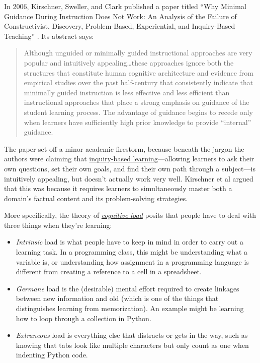 
In 2006, Kirschner, Sweller, and Clark published a paper titled ``Why
Minimal Guidance During Instruction Does Not Work: An Analysis of the
Failure of Constructivist, Discovery, Problem-Based, Experiential, and
Inquiry-Based Teaching'' \cite{fixme}. Its abstract says:

\begin{quote}

  Although unguided or minimally guided instructional approaches are
  very popular and intuitively appealing\ldots{}these approaches
  ignore both the structures that constitute human cognitive
  architecture and evidence from empirical studies over the past
  half-century that consistently indicate that minimally guided
  instruction is less effective and less efficient than instructional
  approaches that place a strong emphasis on guidance of the student
  learning process. The advantage of guidance begins to recede only
  when learners have sufficiently high prior knowledge to provide
  ``internal'' guidance.

\end{quote}

The paper set off a minor academic firestorm, because beneath the jargon
the authors were claiming that
\href{https://en.wikipedia.org/wiki/Inquiry-based\_learning}{inquiry-based
learning}---allowing learners to ask their own questions, set their
own goals, and find their own path through a subject---is intuitively
appealing, but doesn't actually work very well. Kirschner et al argued
that this was because it requires learners to simultaneously master
both a domain's factual content and its problem-solving strategies.

More specifically, the theory of
\emph{\href{https://en.wikipedia.org/wiki/Cognitive\_load}{cognitive load}}
posits that people have to deal with three things when they're
learning:

\begin{itemize}

\item
  \emph{Intrinsic} load is what people have to keep in mind in order to
  carry out a learning task.  In a programming class, this might be
  understanding what a variable is, or understanding how assignment in
  a programming language is different from creating a reference to a
  cell in a spreadsheet.

\item
  \emph{Germane} load is the (desirable) mental effort required to
  create linkages between new information and old (which is one of the
  things that distinguishes learning from memorization).  An example
  might be learning how to loop through a collection in Python.

\item
  \emph{Extraneous} load is everything else that distracts or gets in
  the way, such as knowing that tabs look like multiple characters but
  only count as one when indenting Python code.

\end{itemize}

